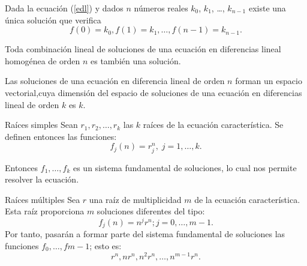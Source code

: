 \begin{frame}




	\begin{theorem}
		Dada la ecuación (\ref{edl}) y dados $n$ números reales $k_{0}$, $k_{1}$, \ldots, $k_{n-1}$ existe una única solución que verifica \[ f\left(0\right)=k_{0},f\left(1\right)=k_{1},\ldots,f\left(n-1\right)=k_{n-1}. \]
	\end{theorem}

	\begin{theorem}
		Toda combinación lineal de soluciones de una ecuación en diferencias lineal homogénea de orden $n$ es también una solución.
	\end{theorem}
	\begin{theorem}
		Las soluciones de una ecuación en diferencia lineal de orden $n$ forman un espacio vectorial,cuya dimensión del espacio de soluciones de una ecuación en diferencias lineal de orden $k$ es $k$.
	\end{theorem}
\end{frame}
\begin{frame}
	\begin{block}{Raíces simples}
		Sean $r_{1}, r_{2},\ldots, r_{k}$ las $k$ raíces de la ecuación característica. Se definen entonces las funciones:
		$$
		f_{j}(n) = r^{n}_{j}, \;  j = 1,\ldots, k.
		$$
		
		Entonces $f_{1},\ldots, f_{k}$  es un sistema fundamental de soluciones, lo cual nos permite resolver la ecuación.
	\end{block}
	\begin{block}{Raíces múltiples}
		Sea $ r $ una raíz de multiplicidad $ m $ de la ecuación característica. Esta raíz proporciona $ m $ soluciones diferentes
		del tipo:
		$$
		f_{j}(n) = n^{j}r^{n}; j = 0, \ldots,m - 1.
		$$
		Por tanto, pasarán a formar parte del sistema fundamental de soluciones las funciones $f_{0}, \ldots, fm-1$; esto
		es:
		$$
		r^{n}, nr^{n}, n^{2}r^{n}, \ldots, n^{m-1}r^{n}.
		$$

	\end{block}
\end{frame}
